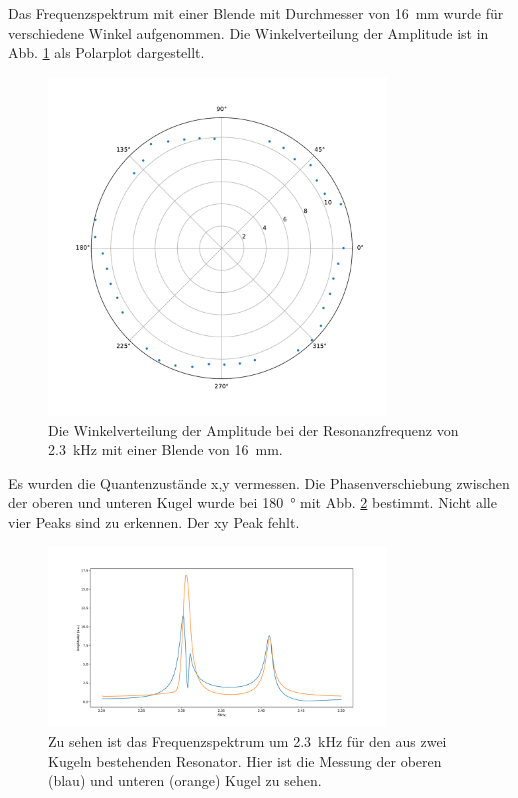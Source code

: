 Das Frequenzspektrum mit einer Blende mit Durchmesser von \SI{16}{\milli\metre} wurde für verschiedene Winkel aufgenommen. Die Winkelverteilung der Amplitude ist in Abb. \ref{fig:polar_molekuel} als Polarplot dargestellt. 

\begin{figure}
    \centering
    \includegraphics[width=0.8\textwidth]{plots/D_3.pdf}
    \caption{Die Winkelverteilung der Amplitude bei der Resonanzfrequenz von \SI{2.3}{\kilo\hertz} mit einer Blende von \SI{16}{\milli\metre}.}
    \label{fig:polar_molekuel}
\end{figure}

Es wurden die Quantenzustände x,y vermessen. 
Die Phasenverschiebung zwischen der oberen und unteren Kugel wurde bei \SI{180}{\degree} mit Abb. \ref{fig:phase} bestimmt. 
Nicht alle vier Peaks sind zu erkennen. Der xy Peak fehlt.

\begin{figure}
    \centering
    \includegraphics[width=0.8\textwidth]{plots/D_phase.pdf}
    \caption{Zu sehen ist das Frequenzspektrum um \SI{2.3}{\kilo\hertz} für den aus zwei Kugeln bestehenden Resonator. Hier ist die Messung der oberen (blau) und unteren (orange) Kugel zu sehen.} %
    \label{fig:phase}
\end{figure}